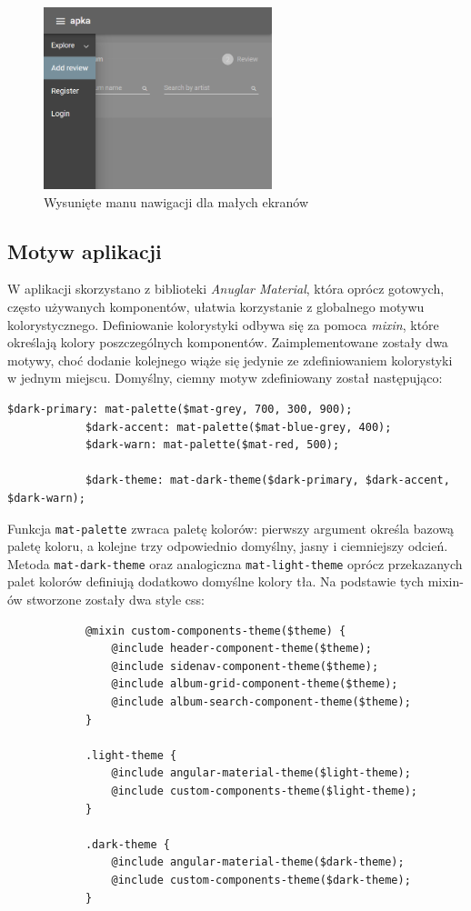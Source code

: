 		\begin{figure}[ht]
			\centering
				\includegraphics[height=200px]{rys05/xs.png}
			 \caption{Wysunięte manu nawigacji dla małych ekranów}
			 \label{fig:xs}
		\end{figure}

	\subsection{Motyw aplikacji}
		W aplikacji skorzystano z biblioteki \emph{Anuglar Material}, która oprócz gotowych, często używanych komponentów,
		ułatwia korzystanie z globalnego motywu kolorystycznego.
		Definiowanie kolorystyki odbywa się za pomoca \emph{mixin}, które określają kolory poszczególnych komponentów.
		Zaimplementowane zostały dwa motywy, choć dodanie kolejnego wiąże się jedynie ze zdefiniowaniem kolorystyki w jednym miejscu.
		Domyślny, ciemny motyw zdefiniowany został następująco:
		\begin{lstlisting}[label=lst:darkTheme]
			$dark-primary: mat-palette($mat-grey, 700, 300, 900);
			$dark-accent: mat-palette($mat-blue-grey, 400);
			$dark-warn: mat-palette($mat-red, 500);
			
			$dark-theme: mat-dark-theme($dark-primary, $dark-accent, $dark-warn);
		\end{lstlisting}
		Funkcja \verb|mat-palette| zwraca paletę kolorów: pierwszy argument określa bazową paletę koloru, a kolejne trzy odpowiednio domyślny, jasny i ciemniejszy odcień.
		Metoda \verb|mat-dark-theme| oraz analogiczna \verb|mat-light-theme| oprócz przekazanych palet kolorów definiują dodatkowo domyślne kolory tła.
		Na podstawie tych mixin-ów stworzone zostały dwa style css:
		\begin{lstlisting}			
			@mixin custom-components-theme($theme) {
				@include header-component-theme($theme);
				@include sidenav-component-theme($theme);
				@include album-grid-component-theme($theme);
				@include album-search-component-theme($theme);
			}
			
			.light-theme {
				@include angular-material-theme($light-theme);
				@include custom-components-theme($light-theme);
			}
			
			.dark-theme {
				@include angular-material-theme($dark-theme);
				@include custom-components-theme($dark-theme);
			}	
		\end{lstlisting}

